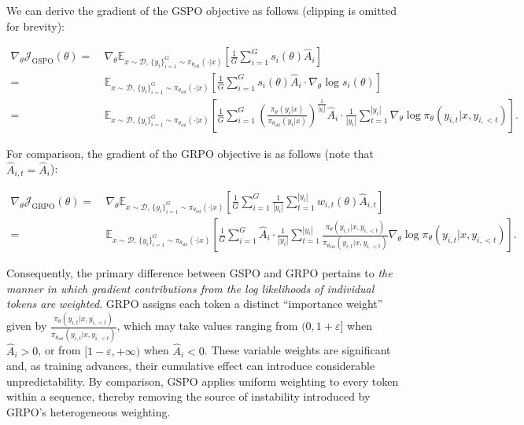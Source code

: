 We can derive the gradient of the GSPO objective as follows (clipping is omitted for brevity):

\begin{align}
\nabla_{\theta} \mathcal{J}_\text{GSPO} (\theta)
=&\ 
\nabla_{\theta} \mathbb{E}_{ x \sim \mathcal{D},\, \{y_i\}_{i=1}^G \sim \pi_{\theta_\text{old}}( \cdot | x) }
\left[ 
\frac{1}{G} \sum_{i=1}^{G} s_{i}(\theta) \widehat{A}_{i}
\right] \\
= &\ 
\mathbb{E}_{ x \sim \mathcal{D},\, \{y_i\}_{i=1}^G \sim \pi_{\theta_\text{old}}( \cdot | x) }
\left[ 
\frac{1}{G} \sum_{i=1}^{G}
s_{i}(\theta) \widehat{A}_{i}
\cdot \nabla_{\theta} \log s_{i}(\theta)
\right] \\
=&\ 
\mathbb{E}_{ x \sim \mathcal{D},\, \{y_i\}_{i=1}^G \sim \pi_{\theta_\text{old}}( \cdot | x) }
\left[ 
\frac{1}{G} \sum_{i=1}^{G} 
\left( \frac{ \pi_{\theta} (y_i | x) }{ \pi_{\theta_\text{old}} (y_i | x)} \right)^{\frac{1}{|y_i|}} \widehat{A}_{i} 
\cdot \frac{1}{|y_i|} \sum_{t=1}^{|y_i|} \nabla_{\theta} \log \pi_{\theta} (y_{i,t} | x, y_{i,<t}) 
\right].
\label{equ:gspo_grad}
\end{align}

For comparison, the gradient of the GRPO objective is as follows (note that $\widehat{A}_{i,t} = \widehat{A}_{i}$):

\begin{align}
\nabla_{\theta} \mathcal{J}_\text{GRPO} (\theta) 
=&\ 
\nabla_{\theta} \mathbb{E}_{ x \sim \mathcal{D},\, \{y_i\}_{i=1}^G \sim \pi_{\theta_\text{old}}( \cdot | x) }
\left[ \frac{1}{G} \sum_{i=1}^{G} \frac{1}{|y_i|} \sum_{t=1}^{|y_i|} 
w_{i,t}(\theta) \widehat{A}_{i,t}
\right] \\
=&\
\mathbb{E}_{ x \sim \mathcal{D},\, \{y_i\}_{i=1}^G \sim \pi_{\theta_\text{old}}( \cdot | x) }
\left[ \frac{1}{G} \sum_{i=1}^{G} \widehat{A}_{i} 
\cdot \frac{1}{|y_i|} \sum_{t=1}^{|y_i|} 
\frac{ \pi_{\theta} (y_{i,t} | x, y_{i,<t}) }{ \pi_{\theta_\text{old}} (y_{i,t} | x,y_{i,<t})} 
\nabla_{\theta} \log \pi_{\theta} (y_{i,t} | x, y_{i,<t})  
\right].
\end{align}

Consequently, the primary difference between GSPO and GRPO pertains to \textit{the manner in which gradient contributions from the log likelihoods of individual tokens are weighted}. GRPO assigns each token a distinct ``importance weight'' given by $\frac{ \pi_{\theta} (y_{i,t} | x, y_{i,<t}) }{ \pi_{\theta_\text{old}} (y_{i,t} | x,y_{i,<t})}$, which may take values ranging from $(0, 1+\varepsilon]$ when $\widehat{A}_{i} >0$, or from $[1-\varepsilon, +\infty)$ when $\widehat{A}_{i} < 0$. These variable weights are significant and, as training advances, their cumulative effect can introduce considerable unpredictability. By comparison, GSPO applies uniform weighting to every token within a sequence, thereby removing the source of instability introduced by GRPO's heterogeneous weighting.

